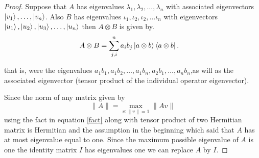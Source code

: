 \begin{proof}
Suppose that $A$ has eigenvalues $\lambda_1,\lambda_2,\dots ,\lambda_n$ with associated   eigenvectors $\ket{v_1},\dots,\ket{v_n}$.
Also $B$ has eigenvalues $\iota_1,\iota_2,\iota_2,\dots \iota_n$ with eigenvectors $\ket{u_1},\ket{u_2},\ket{u_3}, \dots ,\ket{u_n}$ then $A\otimes B$ is given by.
\begin{align}
 A\otimes B&=\sum_{j,i}^n  a_i b_j \ket{a\otimes b}\bra{a \otimes b}.
\end{align}

that is, were the eigenvalues $a_1 b_1,a_1 b_2,\dots,a_1 b_n,a_2b_1,\dots ,a_n b_n$,as will as  the associated  eigenvector  (tensor product of the individual operator eigenvector).

Since the norm of any matrix given by
\begin{equation}
\| A \|=\max_{v: \| v\|=1}\| A v\|\label{fact}
\end{equation}
using the fact in equation \ref {fact} along with tensor product of two Hermitian matrix is Hermitian and the   assumption in the  beginning which said that $A$ has at most eigenvalue equal to one. Since the maximum possible eigenvalue of $A$ is one the identity matrix $I$ has eigenvalues one we can replace $A$ by  $I$.
\end{proof}

